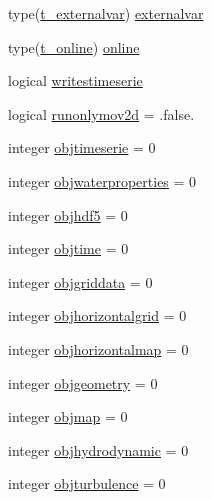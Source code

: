 \begin{DoxyCompactItemize}
\item 
type(\mbox{\hyperlink{structmodulelagrangian_1_1t__externalvar}{t\+\_\+externalvar}}) \mbox{\hyperlink{structmodulelagrangian_1_1t__lagrangian_a0fabf0fec5c942c23d9bfdb9fb2aab2b}{externalvar}}
\item 
type(\mbox{\hyperlink{structmodulelagrangian_1_1t__online}{t\+\_\+online}}) \mbox{\hyperlink{structmodulelagrangian_1_1t__lagrangian_aed06eb0ff0564d81d9d2aa565d3e16d9}{online}}
\item 
logical \mbox{\hyperlink{structmodulelagrangian_1_1t__lagrangian_ae9dc3b9b0c396aaa2acf6f70301528a7}{writestimeserie}}
\item 
logical \mbox{\hyperlink{structmodulelagrangian_1_1t__lagrangian_aa3fe66bd7e1339d24a8ddfdccb066a7f}{runonlymov2d}} = .false.
\item 
integer \mbox{\hyperlink{structmodulelagrangian_1_1t__lagrangian_aace7f4b30f99ca0367506c5456a8c1d7}{objtimeserie}} = 0
\item 
integer \mbox{\hyperlink{structmodulelagrangian_1_1t__lagrangian_a95d63d51c8c205148a884a9715d04236}{objwaterproperties}} = 0
\item 
integer \mbox{\hyperlink{structmodulelagrangian_1_1t__lagrangian_aeeb6441002ba35b0eeee433cb2f040eb}{objhdf5}} = 0
\item 
integer \mbox{\hyperlink{structmodulelagrangian_1_1t__lagrangian_ae3417c90120fcce164272f5d6625ed20}{objtime}} = 0
\item 
integer \mbox{\hyperlink{structmodulelagrangian_1_1t__lagrangian_aa64527e5f17656f65a829578e93c89c6}{objgriddata}} = 0
\item 
integer \mbox{\hyperlink{structmodulelagrangian_1_1t__lagrangian_a49cccfadcc5e8ba3481719e191e94374}{objhorizontalgrid}} = 0
\item 
integer \mbox{\hyperlink{structmodulelagrangian_1_1t__lagrangian_a207b863aa418833233e1761b871072af}{objhorizontalmap}} = 0
\item 
integer \mbox{\hyperlink{structmodulelagrangian_1_1t__lagrangian_aefecfda2b1de36880d98408f1416bd84}{objgeometry}} = 0
\item 
integer \mbox{\hyperlink{structmodulelagrangian_1_1t__lagrangian_a3826066709b4752fb9a97462a9249fb5}{objmap}} = 0
\item 
integer \mbox{\hyperlink{structmodulelagrangian_1_1t__lagrangian_a99f893c3af79dc0dee6dee3547662289}{objhydrodynamic}} = 0
\item 
integer \mbox{\hyperlink{structmodulelagrangian_1_1t__lagrangian_aa5477ff49e3104783452554761c75b1f}{objturbulence}} = 0

\end{DoxyCompactItemize}
